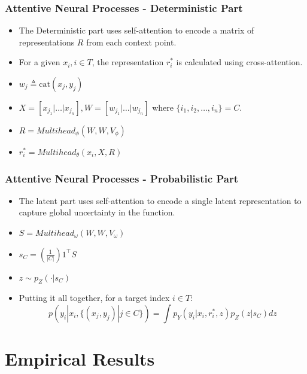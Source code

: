 \documentclass[t]{beamer}
\begin{document}
\begin{frame}
  \frametitle{Attentive Neural Processes - Deterministic Part} 
  \begin{itemize}
  \item The Deterministic part uses self-attention to encode a matrix of representations $R$ from each context point.
  \item For a given $x_i, i \in T$, the representation $r_i^*$ is calculated using cross-attention.
    \item   \(w_j \triangleq \mathrm{cat}(x_j, y_j)\)
  \item \(X = [x_{j_1} | \dots | x_{j_n}], W = [w_{j_1} | \dots | w_{j_n}]\)  where $\{i_1, i_2, \dots, i_n\} = C$.
    \item \(R = Multihead_\phi(W, W, V_\phi)\)
    \item \(r_i^* = Multihead_\theta(x_i, X, R)\)
  \end{itemize}
\end{frame}

\begin{frame}
  \frametitle{Attentive Neural Processes - Probabilistic Part} 
  \begin{itemize}
  \item The latent part uses self-attention to encode a single latent representation to capture global uncertainty in the function.    %
  \item \(S = Multihead_\omega(W, W, V_\omega )\)
  \item \(s_C = \left( \frac 1 {|C|} \right) 1^\top S\)
  \item $z \sim p_Z(\cdot | s_C)$
  \item Putting it all together, for a target index $i \in T$:
    \[
      p(y_i | x_i, \{(x_j, y_j) | j \in C\}) = \int p_Y(y_i | x_i, r_i^*, z) p_Z(z | s_C) dz
    \]
  \end{itemize}
\end{frame}

\section{Empirical Results}
\end{document}
